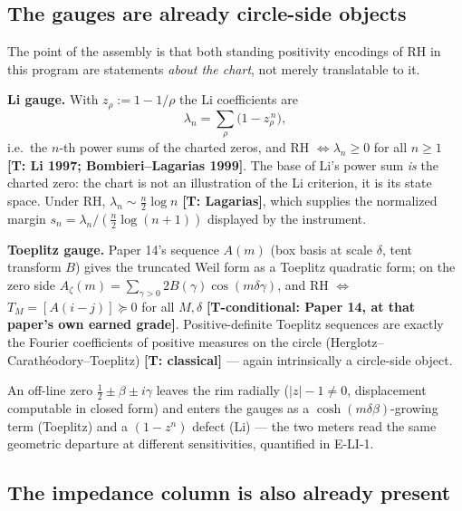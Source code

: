 \documentclass[11pt]{article}
\theoremstyle{remark}
\newcommand{\gr}[1]{\textbf{[#1]}} %
\begin{document}
\subsection{The gauges are already circle-side objects}

The point of the assembly is that both standing positivity encodings of RH in this program
are statements \emph{about the chart}, not merely translatable to it.

\textbf{Li gauge.} With $z_\rho:=1-1/\rho$ the Li coefficients are
\begin{equation}
\lambda_n=\sum_\rho\bigl(1-z_\rho^{\,n}\bigr),
\end{equation}
i.e.\ the $n$-th power sums of the charted zeros, and RH $\Leftrightarrow \lambda_n\ge0$ for
all $n\ge1$ \gr{T: Li 1997; Bombieri--Lagarias 1999}. The base of Li's power sum \emph{is}
the charted zero: the chart is not an illustration of the Li criterion, it is its state
space. Under RH, $\lambda_n\sim\tfrac n2\log n$ \gr{T: Lagarias}, which supplies the
normalized margin $s_n=\lambda_n/(\tfrac n2\log(n+1))$ displayed by the instrument.

\textbf{Toeplitz gauge.} Paper 14's sequence $A(m)$ (box basis at scale $\delta$, tent
transform $B$) gives the truncated Weil form as a Toeplitz quadratic form; on the zero side
$A_\zeta(m)=\sum_{\gamma>0}2B(\gamma)\cos(m\delta\gamma)$, and RH $\Leftrightarrow$
$T_M=[A(i-j)]\succeq0$ for all $M,\delta$ \gr{T-conditional: Paper 14, at that paper's own
earned grade}. Positive-definite Toeplitz sequences are exactly the Fourier coefficients of
positive measures on the circle (Herglotz--Carath\'eodory--Toeplitz) \gr{T: classical} ---
again intrinsically a circle-side object.

An off-line zero $\tfrac12\pm\beta\pm i\gamma$ leaves the rim radially
($|z|-1\ne0$, displacement computable in closed form) and enters the gauges as a
$\cosh(m\delta\beta)$-growing term (Toeplitz) and a $(1-z^n)$ defect (Li) --- the two
meters read the same geometric departure at different sensitivities, quantified in
E-LI-1.

\subsection{The impedance column is also already present}
\end{document}
